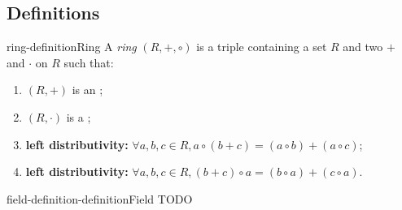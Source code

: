 \documentclass[preview]{standalone}
\begin{document}
\genpage

\subsection{Definitions}

\begin{snippetdefinition}{ring-definition}{Ring}
    A \textit{ring} \((R, +, \circ)\) is a triple containing a set \(R\) and two 
    \(+\) and \(\cdot\) on \(R\) such that:
    \begin{enumerate}
        \item \((R, +)\) is an \abeliangroup;
        \item \((R, \cdot)\) is a \monoid;
        \item \textbf{left distributivity:} \(\forall a,b,c\in R, a\circ(b+c) = (a\circ b) + (a \circ c)\);
        \item \textbf{left distributivity:} \(\forall a,b,c\in R, (b+c)\circ a = (b\circ a) + (c \circ a)\).
    \end{enumerate}
\end{snippetdefinition}

\begin{snippetdefinition}{field-definition-definition}{Field}
    TODO
\end{snippetdefinition}
\end{document}
